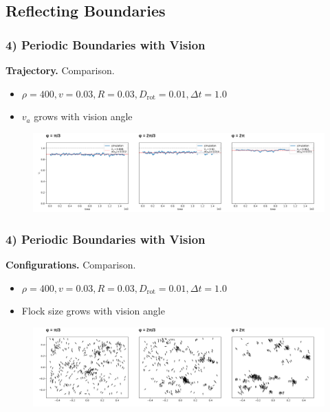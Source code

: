 \subsection{Reflecting Boundaries}

\begin{frame}
	\frametitle{4) Periodic Boundaries with Vision}
	\textbf{Trajectory.} Comparison.
	\begin{itemize}
	    \item $\rho = 400, v = 0.03, R = 0.03, D_{\text{rot}} = 0.01, \Delta t = 1.0$
	    \item $v_a$ grows with vision angle
	\end{itemize}
	\begin{figure}[H]
  		\includegraphics[width=\textwidth]{images/chapter4/trajectory_comp_N_20_L_1.000000_v_0.030000_R_0.030000_D_0.010000.png} 
	\end{figure}
\end{frame}

\begin{frame}
	\frametitle{4) Periodic Boundaries with Vision}
	\textbf{Configurations.} Comparison.
	\begin{itemize}
	    \item $\rho = 400, v = 0.03, R = 0.03, D_{\text{rot}} = 0.01, \Delta t = 1.0$
	    \item Flock size grows with vision angle
	\end{itemize}
	\begin{figure}[H]
  		\includegraphics[width=\textwidth]{images/chapter4/configuration_comp_N_20_L_1.000000_v_0.030000_R_0.030000_D_0.010000.png} 
	\end{figure}
\end{frame}



